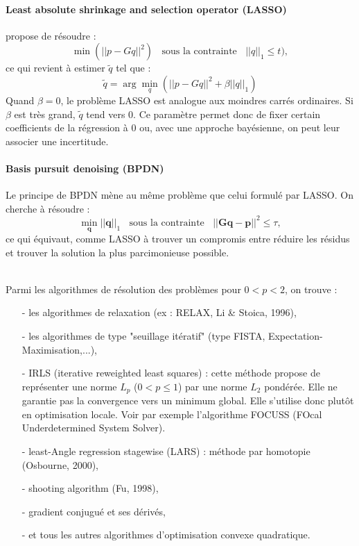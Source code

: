 \paragraph{\tbullet  Least absolute shrinkage and selection operator (LASSO)} \cite{Tibshirani1996} propose de résoudre :
\begin{equation}
\min(||p-Gq||^2) ~~~~\text{sous la contrainte}~~~~||q||_1\leq t),
\end{equation}
ce qui revient à estimer $\tilde{q}$ tel que : 
\begin{equation}
\tilde{q} = \arg\min_q \left( ||p- Gq||^2 + \beta ||q||_1 \right)
\end{equation}
Quand $\beta=0$, le problème LASSO est analogue aux moindres carrés ordinaires. Si $\beta$ est très grand, $\tilde{q}$ tend vers 0. Ce paramètre permet donc de fixer certain coefficients de la régression à 0 ou, avec une approche bayésienne, on peut leur associer une incertitude.

\paragraph{\tbullet  Basis pursuit denoising (BPDN)} Le principe de BPDN mène au même problème que celui formulé par LASSO. On cherche à résoudre :
\begin{equation}
\min_{\bm{q}} ||\bm{q}||_1 ~~~~\text{sous la contrainte}~~~~ ||\bm{Gq}-\bm{p}||^2 \leq \tau,
\end{equation}
ce qui équivaut, comme LASSO à trouver un compromis entre réduire les résidus et trouver la solution la plus parcimonieuse possible.


~\\Parmi les algorithmes de résolution des problèmes pour $0<p<2$, on trouve : 
\begin{itemize}
	\item[-] les algorithmes de relaxation (ex : RELAX, Li \& Stoica, 1996),
	\item[-] les algorithmes de type "seuillage itératif" (type FISTA, Expectation-Maximisation,...),
	\item[-] IRLS (iterative reweighted least squares) : cette méthode propose de représenter une norme $L_p$ ($0<p\leq1$) par une norme $L_2$ pondérée.  %
	 Elle ne garantie pas la convergence vers un minimum global. Elle s'utilise donc plutôt en optimisation locale. Voir par exemple l'algorithme FOCUSS (FOcal Underdetermined System Solver).
	\item[-] least-Angle regression stagewise (LARS) : méthode par homotopie (Osbourne, 2000),
	\item[-] shooting algorithm (Fu, 1998),
	\item[-] gradient conjugué et ses dérivés,
	\item[-] et tous les autres algorithmes d'optimisation convexe quadratique.
\end{itemize}

